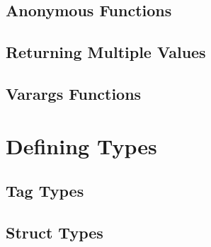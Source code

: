 \documentclass{article}
\begin{document}
\subsection{Anonymous Functions}
\subsection{Returning Multiple Values}
\subsection{Varargs Functions}


\section{Defining Types}
\subsection{Tag Types}
\subsection{Struct Types}
\end{document}
